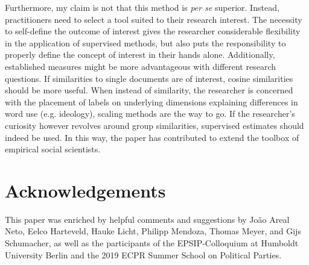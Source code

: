 \documentclass{article}
\begin{document}
Furthermore, my claim is not that this method is \textit{per se} superior. Instead, practitioners need to select a tool suited to their research interest. The necessity to self-define the outcome of interest gives the researcher considerable flexibility in the application of supervised methods, but also puts the responsibility to properly define the concept of interest in their hands alone. Additionally, established measures might be more advantageous with different research questions. If similarities to single documents are of interest, cosine similarities should be more useful. When instead of similarity, the researcher is concerned with the placement of labels on underlying dimensions explaining differences in word use (e.g. ideology), scaling methods are the way to go. If the researcher's curiosity however revolves around group similarities, supervised estimates should indeed be used. In this way, the paper has contributed to extend the toolbox of empirical social scientists. \par



\section*{Acknowledgements}
This paper was enriched by helpful comments and suggestions by João Areal Neto, Eelco Harteveld, Hauke Licht, Philipp Mendoza, Thomas Meyer, and Gijs Schumacher, as well as the participants of the EPSIP-Colloquium at Humboldt University Berlin and the 2019 ECPR Summer School on Political Parties.


\printbibliography

\newpage
\end{document}
